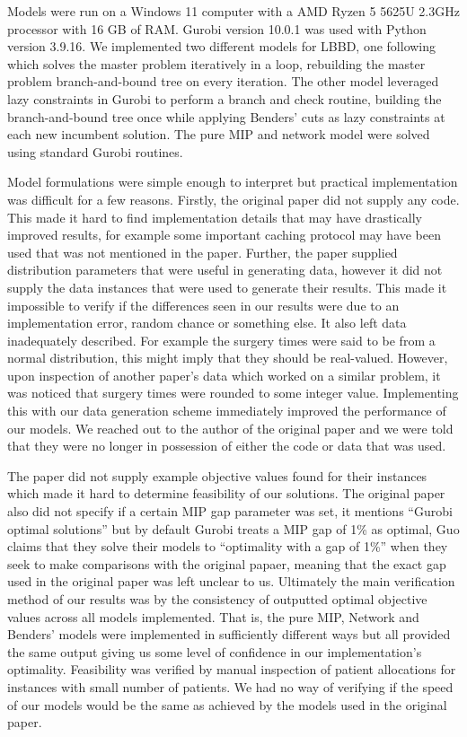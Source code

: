 Models were run on a Windows 11 computer with a AMD Ryzen 5 5625U 2.3GHz processor with 16 GB of RAM\@. Gurobi version 10.0.1 was used with Python version 3.9.16. We implemented two different models for LBBD, one following\cite{roshanaei2017propagating} which solves the master problem iteratively in a loop, rebuilding the master problem branch-and-bound tree on every iteration. The other model leveraged lazy constraints in Gurobi to perform a branch and check routine\cite{LBBDBible}, building the branch-and-bound tree once while applying Benders' cuts as lazy constraints at each new incumbent solution. The pure MIP and network model were solved using standard Gurobi routines. 

Model formulations were simple enough to interpret but practical implementation was difficult for a few reasons. Firstly, the original paper did not supply any code. This made it hard to find implementation details that may have drastically improved results, for example some important caching protocol may have been used that was not mentioned in the paper. Further, the paper supplied distribution parameters that were useful in generating data, however it did not supply the data instances that were used to generate their results. This made it impossible to verify if the differences seen in our results were due to an implementation error, random chance or something else. It also left data inadequately described. For example the surgery times were said to be from a normal distribution, this might imply that they should be real-valued. However, upon inspection of another paper's data which worked on a similar problem\cite{guo}, it was noticed that surgery times were rounded to some integer value. Implementing this with our data generation scheme immediately improved the performance of our models. We reached out to the author of the original paper and we were told that they were no longer in possession of either the code or data that was used. 

The paper did not supply example objective values found for their instances which made it hard to determine feasibility of our solutions. The original paper also did not specify if a certain MIP gap parameter was set, it mentions ``Gurobi optimal solutions'' but by default Gurobi treats a MIP gap of 1\% as optimal, Guo claims that they solve their models to ``optimality with a gap of 1\%'' when they seek to make comparisons with the original papaer, meaning that the exact gap used in the original paper was left unclear to us. Ultimately the main verification method of our results was by the consistency of outputted optimal objective values across all models implemented. That is, the pure MIP, Network and Benders' models were implemented in sufficiently different ways but all provided the same output giving us some level of confidence in our implementation's optimality. Feasibility was verified by manual inspection of patient allocations for instances with small number of patients. We had no way of verifying if the speed of our models would be the same as achieved by the models used in the original paper.

